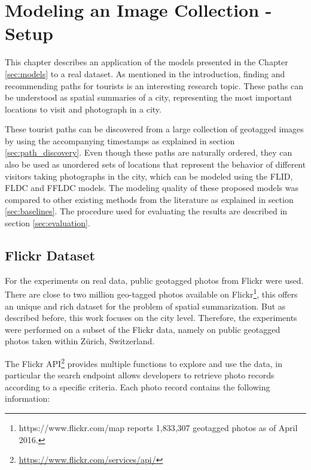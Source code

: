 \chapter{Modeling an Image Collection - Setup}
\label{sec:experimental_setup}

This chapter describes an application of the models presented in the Chapter \ref{sec:models} to a real dataset. As mentioned in the introduction, finding and recommending paths for tourists is an interesting research topic. These paths can be understood as spatial summaries of a city, representing the most important locations to visit and photograph in a city.

These tourist paths can be discovered from a large collection of geotagged images by using the accompanying timestamps as explained in section \ref{sec:path_discovery}. Even though these paths are naturally ordered, they can also be used as unordered sets of locations that represent the behavior of different visitors taking photographs in the city, which can be modeled using the FLID, FLDC and FFLDC models. The modeling quality of these proposed models was compared to other existing methods from the literature as explained in section \ref{sec:baselines}. The procedure used for evaluating the results are described in section \ref{sec:evaluation}.

\section{Flickr Dataset}

For the experiments on real data, public geotagged photos from Flickr were used. There are close to two million geo-tagged photos available on Flickr\footnote{https://www.flickr.com/map reports 1,833,307 geotagged photos as of April 2016.}, this offers an unique and rich dataset for the problem of spatial summarization. But as described before, this work focuses on the city level. Therefore, the experiments were performed on a subset of the Flickr data, namely on public geotagged photos taken within Zürich, Switzerland.

The Flickr API\footnote{\url{https://www.flickr.com/services/api/}} provides multiple functions to explore and use the data, in particular the search endpoint allows developers to retrieve photo records according to a specific criteria. Each photo record contains the following information:

